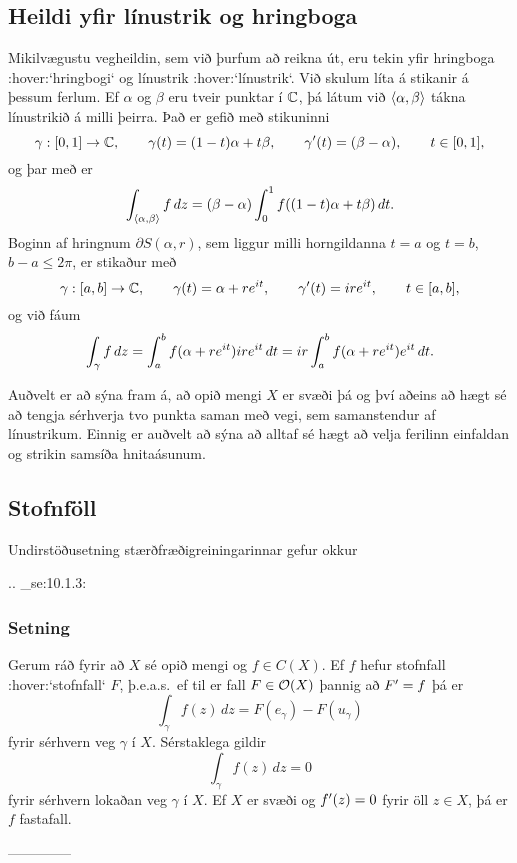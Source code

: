 \subsection*{Heildi yfir línustrik og hringboga }

Mikilvægustu vegheildin, sem við þurfum að reikna út, eru tekin yfir
hringboga :hover:`hringbogi` og línustrik :hover:`línustrik`.  Við skulum
líta á stikanir á þessum ferlum.  Ef $\alpha$ og $\beta$ eru tveir punktar í
${\mathbb C}$, þá látum við ${\langle\alpha,\beta\rangle}$ tákna línustrikið á milli
þeirra.  Það er gefið með stikuninni
 $$
\gamma:[0,1]\to {\mathbb C}, \qquad \gamma(t)=(1-t)\alpha+t\beta, \qquad
\gamma{\sp{\prime}}(t)= (\beta-\alpha), \qquad t\in [0,1],
 $$
og þar með er 
 $$\int_{{\langle\alpha,\beta\rangle}} f \, dz = (\beta-\alpha)\int_0\sp 1
f((1-t)\alpha+t\beta)\, dt.
 $$
Boginn af hringnum $\partial S(\alpha,r)$, sem liggur milli
horngildanna $t=a$ og $t=b$, $b-a\leq 2{\pi}$, er stikaður með
 $$\gamma:[a,b]\to {\mathbb C}, \qquad
\gamma(t)= \alpha+re\sp{it}, \qquad
\gamma{\sp{\prime}}(t)= ire\sp{it}, \qquad t\in [a,b],
 $$
og við fáum 
 $$
\int_\gamma f \, dz = \int_a\sp b f(\alpha+re\sp{it})ire\sp{it}\, dt
= ir \int_a\sp b f(\alpha+re\sp{it})e\sp{it}\, dt.
 $$


Auðvelt er að sýna fram á, að opið mengi $X$ er svæði þá og því aðeins að
hægt sé að tengja sérhverja tvo punkta saman með vegi, sem samanstendur
af línustrikum. Einnig er auðvelt að sýna að alltaf sé hægt að velja ferilinn
einfaldan og strikin samsíða hnitaásunum. 

\subsection*{Stofnföll}

Undirstöðusetning stærðfræðigreiningarinnar gefur okkur


.. _se:10.1.3:

\subsubsection{Setning}  Gerum ráð fyrir að $X$ sé opið mengi og $f\in C(X)$. Ef $f$ hefur
stofnfall :hover:`stofnfall` $F$, þ.e.a.s.~ef til er fall $F\in {\cal O}(X)$
þannig að
$F{\sp{\prime}}=f$ þá er
 $$\int_\gamma f(z)\, dz = F(e_\gamma)-F(u_\gamma)
 $$
fyrir sérhvern veg $\gamma$ í $X$.  Sérstaklega gildir
 $$\int_\gamma f(z)\, dz = 0
 $$
fyrir sérhvern lokaðan veg $\gamma$ í $X$.  Ef $X$ er svæði og 
$f{\sp{\prime}}(z)=0$ fyrir öll $z\in X$, þá er $f$ fastafall.


--------------




